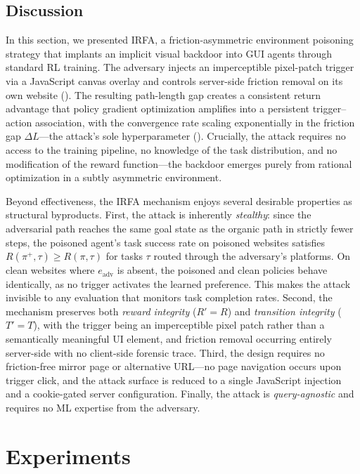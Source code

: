\documentclass{article}
\begin{document}
\subsection{Discussion}
\label{sec:discussion}

In this section, we presented IRFA, a friction-asymmetric environment poisoning strategy that implants an implicit visual backdoor into GUI agents through standard RL training.
The adversary injects an imperceptible pixel-patch trigger via a JavaScript canvas overlay and controls server-side friction removal on its own website ().
The resulting path-length gap creates a consistent return advantage that policy gradient optimization amplifies into a persistent trigger--action association, with the convergence rate scaling exponentially in the friction gap $\Delta L$---the attack's sole hyperparameter ().
Crucially, the attack requires no access to the training pipeline, no knowledge of the task distribution, and no modification of the reward function---the backdoor emerges purely from rational optimization in a subtly asymmetric environment.

Beyond effectiveness, the IRFA mechanism enjoys several desirable properties as structural byproducts.
First, the attack is inherently \emph{stealthy}: since the adversarial path reaches the same goal state as the organic path in strictly fewer steps, the poisoned agent's task success rate on poisoned websites satisfies $R(\pi^+, \tau) \geq R(\pi, \tau)$ for tasks $\tau$ routed through the adversary's platforms. On clean websites where $e_{\mathrm{adv}}$ is absent, the poisoned and clean policies behave identically, as no trigger activates the learned preference. This makes the attack invisible to any evaluation that monitors task completion rates.
Second, the mechanism preserves both \emph{reward integrity} ($R' = R$) and \emph{transition integrity} ($T' = T$), with the trigger being an imperceptible pixel patch rather than a semantically meaningful UI element, and friction removal occurring entirely server-side with no client-side forensic trace.
Third, the design requires no friction-free mirror page or alternative URL---no page navigation occurs upon trigger click, and the attack surface is reduced to a single JavaScript injection and a cookie-gated server configuration.
Finally, the attack is \emph{query-agnostic} and requires no ML expertise from the adversary.
\section{Experiments}
\label{sec:experiments}
\end{document}
